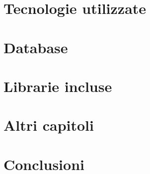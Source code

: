 
\chapter{Tecnologie utilizzate}
\lipsum
\chapter{Database}

\chapter{Librarie incluse}



\chapter{Altri capitoli}
\chapter{Conclusioni}

